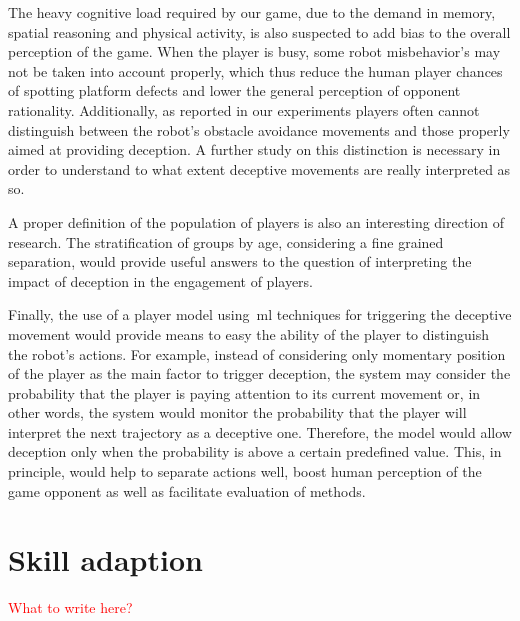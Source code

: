 The heavy cognitive load required by our game, due to the demand in memory, spatial reasoning and  physical activity, is also suspected to add bias to the overall perception of the game. When the player is busy, some robot misbehavior's may not be taken into account properly, which thus reduce the human player chances of spotting platform defects and lower the general perception of opponent rationality. Additionally, as reported in our experiments players often cannot distinguish between the robot's obstacle avoidance movements and those properly aimed at providing deception. A further study on this distinction is necessary in order to understand to what extent deceptive movements are really interpreted as so.

A proper definition of the population of players is also an interesting direction of research. The stratification of groups by age, considering a fine grained separation, would provide useful answers to the question of interpreting the impact of deception in the engagement of players.

Finally, the use of a player model using~\gls{ml} techniques for triggering the deceptive movement would provide means to easy the ability of the player to distinguish the robot's actions. For example, instead of considering only momentary position of the player as the main factor to trigger deception, the system may consider the probability that the player is paying attention to its current movement or, in other words, the system would monitor the probability that the player will interpret the next trajectory as a deceptive one. Therefore, the model would allow deception only when the probability is above a certain predefined value. This, in principle, would help to separate actions well, boost human perception of the game opponent as well as facilitate evaluation of methods.

\section{Skill adaption}
\textcolor{red}{What to write here?}